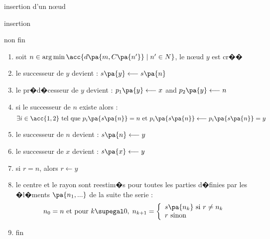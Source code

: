 \begin{xalgorithm}{insertion d'un n\oe ud}
\begin{xalgostep}{insertion}
\begin{xwhile}{non fin}
\begin{xif}
                    \begin{enumerate}
                    \item soit $ n\in \arg \min \acc{ d\pa{m,C\pa{n'}} \;|\; n' \in N}$, le n\oe ud $y$ est cr��
                    \item le successeur de $y$ devient : $s\pa{y} \longleftarrow s\pa{n}$
                    \item le pr�d�cesseur de $y$ devient : $p_1\pa{y} \longleftarrow x$ 
                                                        and $p_2\pa{y} \longleftarrow n$
                    \item si le successeur de $n$ existe alors :
                        $$
                        \exists i \in \acc{1,2} \text{ tel que } p_i\pa{s\pa{n}} = n \text{ et } 
                                            p_i\pa{s\pa{n}} \longleftarrow  p_i\pa{s\pa{n}} = y
                        $$
                    \item le successeur de $n$ devient : $s\pa{n} \longleftarrow y$
                    \item le successeur de $x$ devient : $s\pa{x} \longleftarrow y$
                    \item si $r = n$, alors $r \longleftarrow y$
                    \item le centre et le rayon sont reestim�s pour toutes les parties d�finies par
                            les �l�ments $\pa{n_1,...}$ de la suite the serie :
                                    $$
                                    n_0 = n \textnormal{ et pour } k \supegal 0, \;
                                                        n_{k+1} = \left\{
                                                                    \begin{array}{l}
                                                                    s\pa{n_k} \textnormal{ si } r \neq n_k \\
                                                                    r \textnormal{ sinon }
                                                                    \end{array}
                                                                    \right.
                                    $$
                    \item fin
                    \end{enumerate}
        

\end{xif}
\end{xwhile}
\end{xalgostep}
\end{xalgorithm}
